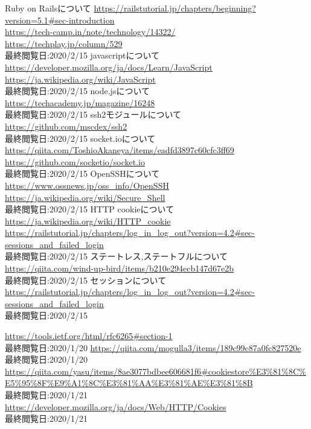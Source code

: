 \begin{thebibliography}{99}
 Ruby on Railsについて \url{https://railstutorial.jp/chapters/beginning?version=5.1#sec-introduction} \\ \url{https://tech-camp.in/note/technology/14322/} \\ \url{https://techplay.jp/column/529}  \\ 最終閲覧日:2020/2/15
 javascriptについて \\ \url{https://developer.mozilla.org/ja/docs/Learn/JavaScript} \\ \url{https://ja.wikipedia.org/wiki/JavaScript}\\ 最終閲覧日:2020/2/15
 node.jsについて \\ \url{https://techacademy.jp/magazine/16248} \\ 最終閲覧日:2020/2/15
 ssh2モジュールについて \\ \url{https://github.com/mscdex/ssh2} \\ 最終閲覧日:2020/2/15
 socket.ioについて \\ \url{https://qiita.com/ToshioAkaneya/items/eadfd3897c60cfc3ff69} \\ \url{https://github.com/socketio/socket.io} \\ 最終閲覧日:2020/2/15
 OpenSSHについて \\ \url{https://www.ossnews.jp/oss_info/OpenSSH} \\ \url{https://ja.wikipedia.org/wiki/Secure_Shell} \\ 最終閲覧日:2020/2/15
 HTTP cookieについて \\ \url{https://ja.wikipedia.org/wiki/HTTP_cookie} \\ \url{https://railstutorial.jp/chapters/log_in_log_out?version=4.2#sec-sessions_and_failed_login} \\ 最終閲覧日:2020/2/15
 ステートレス,ステートフルについて \\ \url{https://qiita.com/wind-up-bird/items/b210e294ecb147d67e2b} \\ 最終閲覧日:2020/2/15
 セッションについて \\ \url{https://railstutorial.jp/chapters/log_in_log_out?version=4.2#sec-sessions_and_failed_login} \\ 最終閲覧日:2020/2/15

 \url{https://tools.ietf.org/html/rfc6265#section-1} \\ 最終閲覧日:2020/1/20
 \url{https://qiita.com/mogulla3/items/189c99c87a0fc827520e} \\ 最終閲覧日:2020/1/20
 \url{https://qiita.com/yasu/items/8ae3077bdbee606681f6#cookiestore%E3%81%8C%E5%95%8F%E9%A1%8C%E3%81%AA%E3%81%AE%E3%81%8B} \\ 最終閲覧日:2020/1/21
 \url{https://developer.mozilla.org/ja/docs/Web/HTTP/Cookies} \\最終閲覧日:2020/1/21




\end{thebibliography}
